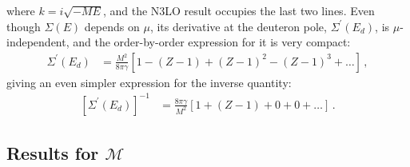 \documentclass[prl,
twocolumn,
showpacs,preprintnumbers,amsmath,amssymb,
superscriptaddress,
a4paper,nofootinbib,longbibliography]{revtex4-2}
\begin{document}
\endgroup
where $k=i\sqrt{-ME}$, and the N3LO result occupies the last two lines. Even though $\Sigma(E)$ depends on $\mu$, its derivative at the deuteron pole, $\Sigma^\prime(E_d)$, is $\mu$-independent, and the order-by-order expression for it is very compact:
\begin{align}
\Sigma^\prime(E_d) &= \frac{M^2}{8\pi\gamma}\left[1-(Z-1)+(Z-1)^2-(Z-1)^3+\dots\right]\,,
\end{align}
giving an even simpler expression for the inverse quantity:
\begin{align}
    \left[\Sigma^\prime(E_d)\right]^{-1} & = \frac{8\pi\gamma}{M^2}\left[1+(Z-1)+0+0+\dots\right]\,.
\end{align}

\subsection{Results for $\mathcal{M}$}
\end{document}
